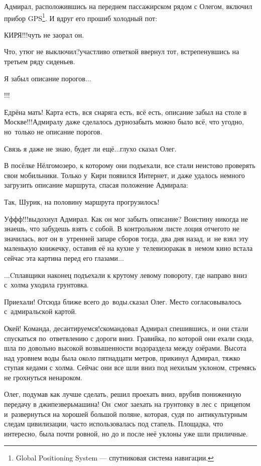 Адмирал, расположившись на переднем пассажирском рядом с Олегом, включил прибор GPS\footnote{Global Positioning System --- спутниковая система навигации.}. И вдруг его прошиб холодный пот:

\diagdash КИРЯ!!!\mdash чуть не заорал он.

\diagdash Что, утюг не выключил?\mdash участливо ответкой ввернул тот, встрепенувшись на третьем ряду сиденьев.

\diagdash Я забыл описание порогов$\ldots$

\diagdash !!!

\diagdash Едрёна мать! Карта есть, вся снаряга есть, всё есть, описание забыл на столе в Москве!!!\mdash Адмиралу даже сделалось дурно\mdash забыть можно было всё, что угодно, но~только не описание порогов. 

\diagdash Связь я даже не знаю, будет ли ещё$\ldots$\mdash глухо сказал Олег.

В посёлке Нёлгомозеро, к которому они подъехали, все стали неистово проверять свои мобильники. Только у~Кири появился Интернет, и даже удалось немного загрузить описание маршрута, спасая положение Адмирала:

\diagdash Так, Шурик, на половину маршрута прогрузилось!

\diagdash Уф\sdash ф\sdash ф!!!\mdash выдохнул Адмирал. Как он мог забыть описание? Воистину никогда не знаешь, что забудешь взять с собой. В контрольном листе лоция отчего\sdash то не значилась, вот он в~утренней запаре сборов тогда, два дня назад, и~не взял эту маленькую книжечку, оставив её на кухне у~телевизора\mdash как в~немом кино встала сейчас эта картина перед его глазами$\ldots$

\newpage
$\ldots$Cплавщики наконец подъехали к крутому левому повороту, где направо вниз с~холма уходила грунтовка. 

\diagdash Приехали! Отсюда ближе всего до~воды.\mdash сказал Олег. Место согласовывалось с~адмиральской картой. 

\diagdash Окей! Команда, десантируемся!\mdash скомандовал Адмирал спешившись, и они стали спускаться по~ответвлению с дороги вниз. Гравийка, по которой они ехали сюда, шла по довольно высокой возвышенности водораздела между озёрами. Высота над уровнем воды была около пятнадцати метров, прикинул Адмирал, тяжко ступая кедами с холма. Сейчас они все шли вниз под нехилым уклоном, стремясь не грохнуться ненароком.

Олег, подумав как лучше сделать, решил проехать вниз, врубив пониженную передачу в джипе\mdash зверь\nobreakdash\sdash\nobreakdash машина! Он~смог заехать на грунтовку в лес с~прицепом и~развернуться на хорошей большой поляне, которая, судя по~антикультурным следам цивилизации, часто использовалась под стапель. Площадка, что интересно, была почти ровной, но до и после неё уклоны уже шли приличные.

